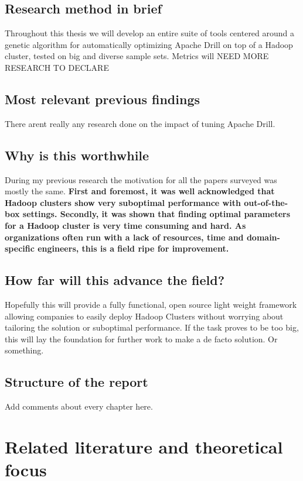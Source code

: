 \documentclass[a4paper,english]{report}
\begin{document}
		\section{Research method in brief}
		Throughout this thesis we will develop an entire suite of tools centered around a genetic algorithm for automatically optimizing Apache Drill on top of a Hadoop cluster, tested on big and diverse sample sets. Metrics will NEED MORE RESEARCH TO DECLARE
		\section{Most relevant previous findings}
		There arent really any research done on the impact of tuning Apache Drill.
		
		\section{Why is this worthwhile}
		During my previous research the motivation for all the papers surveyed was mostly the same. \textbf{First and foremost, it was well acknowledged that Hadoop clusters show very suboptimal performance with out-of-the-box settings. Secondly, it was shown that finding optimal parameters for a Hadoop cluster is very time consuming and hard. As organizations often run with a lack of resources, time and domain-specific engineers, this is a field ripe for improvement.}
		\section{How far will this advance the field?}
		Hopefully this will provide a fully functional, open source light weight framework allowing companies to easily deploy Hadoop Clusters without worrying about tailoring the solution or suboptimal performance. If the task proves to be too big, this will lay the foundation for further work to make a de facto solution. Or something.
		\section{Structure of the report}
		Add comments about every chapter here.
	\chapter{Related literature and theoretical focus}
\end{document}
